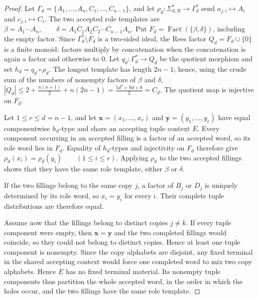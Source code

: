 \documentclass[10pt,a4paper]{article}
\theoremstyle{definition}
\theoremstyle{remark}
\begin{document}
\begin{proof}
Let
\(\Gamma_d=\{A_1,\ldots,A_n,C_1,\ldots,C_{n-1}\}\), and let
\(\rho_d:\Sigma_{d,R}^*\to\Gamma_d^*\) send
\(a_{j,i}\mapsto A_i\) and \(c_{j,i}\mapsto C_i\).  The two accepted role
templates are
\(\beta=A_1\cdots A_n, \qquad \delta=A_1C_1A_2C_2\cdots C_{n-1}A_n.\)
Put \(F_d=\operatorname{Fact}(\{\beta,\delta\})\), including the empty
factor.  Since \(\Gamma_d^*\setminus F_d\) is a two-sided ideal, the Rees
factor
\(Q_d=F_d\cup\{0\}\)
is a finite monoid: factors multiply by concatenation when the concatenation
is again a factor and otherwise to \(0\).  Let \(q_d:\Gamma_d^*\to Q_d\)
be the quotient morphism and set \(h_d=q_d\circ\rho_d\).  The longest
template has length \(2n-1\); hence, using the crude sum of the numbers of
nonempty factors of \(\beta\) and \(\delta\),
\(|Q_d| \le 2+\frac{n(n+1)}2+n(2n-1) =\frac{5d^2+9d+8}{2}=C_d.\)
The quotient map is injective on \(F_d\).

Let \(1\le r\le d=n-1\), and let
\(\mathbf x=(x_1,\ldots,x_r)\) and
\(\mathbf y=(y_1,\ldots,y_r)\) have equal componentwise \(h_d\)-type and
share an accepting tuple context \(E\).  Every component occurring in an
accepted filling is a factor of an accepted word, so its role word lies in
\(F_d\).  Equality of \(h_d\)-types and injectivity on \(F_d\) therefore
give
\(\rho_d(x_i)=\rho_d(y_i)\qquad(1\le i\le r).\)
Applying \(\rho_d\) to the two accepted fillings shows that they have the
same role template, either \(\beta\) or \(\delta\).

If the two fillings belong to the same copy \(j\), a factor of \(B_j\) or
\(D_j\) is uniquely determined by its role word, so \(x_i=y_i\) for every
\(i\).  Their complete tuple distributions are therefore equal.

Assume now that the fillings belong to distinct copies \(j\ne k\).
If every tuple component were empty, then \(\mathbf x=\mathbf y\) and the two
completed fillings would coincide, so they could not belong to distinct
copies.  Hence at least one tuple component is nonempty.  Since the copy
alphabets are disjoint, any fixed terminal in the shared accepting context
would force one completed word to mix two copy alphabets.  Hence
\(E\) has no fixed terminal material.  Its nonempty tuple components thus
partition the whole accepted word, in the order in which the holes occur,
and the two fillings have the same role template.


\end{proof}
\end{document}
